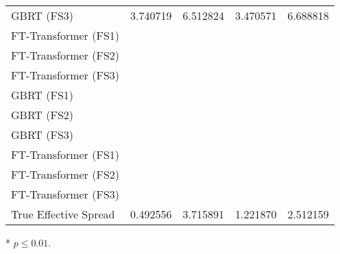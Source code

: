 \begin{threeparttable}
\begin{tabular}{@{}lSSSS@{}}
        \gls{GBRT} (FS3)       & 3.740719                                                & 6.512824 \tnote{*}                                       & 3.470571      & 6.688818 \tnote{*}   \\
        FT-Transformer (FS1)  &                                                         & \tnote{*}                                                &               & \tnote{*}            \\
        FT-Transformer (FS2)  &                                                         & \tnote{*}                                                &               & \tnote{*}            \\
        FT-Transformer (FS3)  &                                                         & \tnote{*}                                                &               & \tnote{*}            \\ \midrule
        \gls{GBRT} (FS1)       &                                                         & \tnote{*}                                                &               & \tnote{*}            \\
        \gls{GBRT} (FS2)       &                                                         & \tnote{*}                                                &               & \tnote{*}            \\
        \gls{GBRT} (FS3)       &                                                         & \tnote{*}                                                &               & \tnote{*}            \\
        FT-Transformer (FS1)  &                                                         & \tnote{*}                                                &               & \tnote{*}            \\
        FT-Transformer (FS2)  &                                                         & \tnote{*}                                                &               & \tnote{*}            \\
        FT-Transformer (FS3)  &                                                         & \tnote{*}                                                &               & \tnote{*}            \\ \midrule
        True Effective Spread & 0.492556                                                & 3.715891                                                 & 1.221870      & 2.512159             \\ \bottomrule
    \end{tabular}
    \begin{tablenotes}\footnotesize
        \item[*] $p \leq 0.01$.
    \end{tablenotes}
\end{threeparttable}